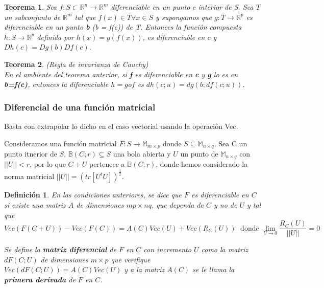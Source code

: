 \documentclass{article}
\theoremstyle{theorem-style}  %
\newtheorem{theorem}{Teorema}[section]  %
\theoremstyle{definition-style}
\newtheorem{definition}{Definición}[section]
\theoremstyle{example-style}
\theoremstyle{exercise-style}
\begin{document}
	\begin{theorem}
		Sea $f: S\subset \mathbb{R}^n \rightarrow \mathbb{R}^m$ diferenciable en un punto $c$ interior de S. Sea $T$ un subconjunto de $\mathbb{R}^m$ tal que $f(x) \in T \forall x \in S$ y supongamos que $g: T \rightarrow \mathbb{R}^p$ es diferenciable en un punto \textbf{b} (b = f(c)) de T. Entonces la función compuesta $h: S \rightarrow \mathbb{R}^p$ definida por $h(x)=g(f(x))$, es diferenciable en $c$ y $Dh(c)=Dg(b)Df(c)$.
	\end{theorem}
	
	\begin{theorem} (Regla de invarianza de Cauchy) \\
		En el ambiente del teorema anterior, si \textbf{f} es diferenciable en \textbf{c} y \textbf{g} lo es en \textbf{b=f(c)}, entonces la diferenciable $h=g$o$f$ es $dh(c;u) = dg(b;df(c;u))$.   
		
	\end{theorem}
	
	\subsubsection{Diferencial de una función matricial}
	
	Basta con extrapolar lo dicho en el caso vectorial usando la operación Vec.
	
	Consideramos una función matricial $F: S \rightarrow \mathbb{M}_{m\times p}$ donde $S \subseteq \mathbb{M}_{n\times q}$. Sea C un punto itnerior de $S$, $\mathbb{B}(C;r) \subseteq S$ una bola abierta y $U$ un punto de $\mathbb{M}_{n\times q}$ con $||U||<r$, por lo que $C+U$ pertenece a $\mathbb{B}(C;r)$, donde hemos considerado la norma matricial $||U||=(tr[U^tU])^{\frac{1}{2}}$.
	
	\begin{definition}
		\textit{	En las condiciones anteriores, se dice que $F$ es diferenciable en $C$ si existe una matriz $A$ de dimensiones $mp\times nq$, que dependa de $C$ y no de $U$ y tal que}
		$$Vec(F(C+U))-Vec(F(C))=A(C)Vec(U)+Vec(R_C(U))\; \text{ donde } \lim\limits_{U\rightarrow 0} \frac{R_C(U)}{||U||} = 0$$
		
		\textit{Se define la \textbf{matriz diferencial} de $F$ en $C$ con incremento $U$ como la matriz $dF(C;U)$ de dimensiones $m\times p$ que verifique $Vec(dF(C;U))=A(C)Vec(U)$ y a la matriz $A(C)$ se le llama la \textbf{primera derivada} de $F$ en $C$.}
	\end{definition}
	
\end{document}
